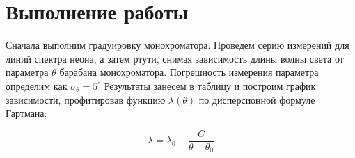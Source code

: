\documentclass[12pt]{kiarticle}
\begin{document}
	


	
	
	
	\section{Выполнение работы}
	
	Сначала выполним градуировку монохроматора. Проведем серию измерений для линий спектра неона, а затем ртути, снимая зависимость длины волны света от параметра $ \theta $ барабана монохроматора. Погрешность измерения параметра определим как $ \sigma_\theta = 5 ^\circ $ Результаты занесем в таблицу и построим график зависимости, профитировав функцию $ \lambda (\theta) $ по дисперсионной формуле Гартмана:
	
	\begin{equation}\label{labda(thta)}
	\lambda = \lambda_0 + \dfrac{C}{\theta - \theta_0}
	\end{equation}
	
\end{document}
